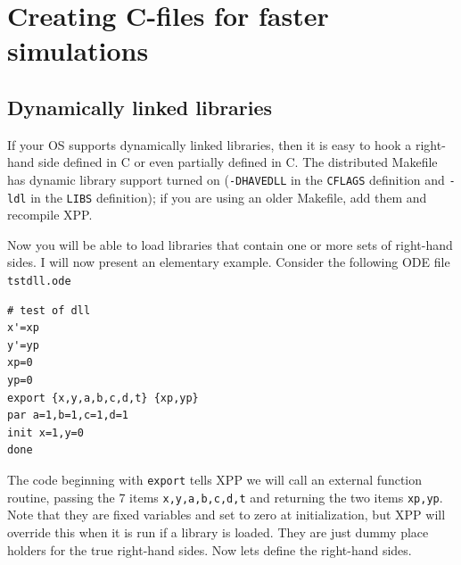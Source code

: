 \documentclass{article}
\begin{document}
\section{Creating C-files for faster simulations}
\subsection{Dynamically linked libraries}
If your OS supports dynamically linked libraries, then it is easy to
hook a right-hand side defined in C or even partially defined in
C. The distributed Makefile has dynamic library support turned on
({\tt -DHAVEDLL} in the {\tt CFLAGS} definition and {\tt -ldl} in the {\tt LIBS}
definition); if you are using an older Makefile, add them and recompile XPP.


Now you will be able to load libraries that contain one or more sets
of right-hand sides.  I will now present an
elementary example. Consider the following ODE file {\tt tstdll.ode}
\begin{verbatim}
# test of dll
x'=xp
y'=yp
xp=0
yp=0
export {x,y,a,b,c,d,t} {xp,yp}
par a=1,b=1,c=1,d=1
init x=1,y=0
done

\end{verbatim}
The code beginning with {\tt export} tells XPP we will call an
external function routine, passing the 7 items {\tt x,y,a,b,c,d,t} and
returning the two items {\tt xp,yp}.  Note that they are fixed
variables and set to zero at initialization, but XPP will override
this when it is run if a library is loaded.
  They are just dummy place holders for the true
right-hand sides.  Now lets define the right-hand sides. 
\end{document}
